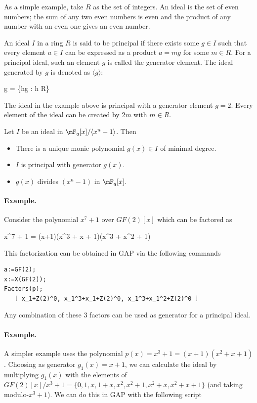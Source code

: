 As a simple example, take $R$ as the set of integers. An ideal is the set of even numbers; the sum of any two even numbers is even and the product of any number with an even one gives an even number.

\begin{definition}
  An ideal $I$ in a ring $R$ is said to be principal if there exists some $g \in I$ such that every element $a \in I$ can be expressed as a product $a = mg$ for some $m \in R$. For a principal ideal, such an element $g$ is called the generator element. The ideal generated by $g$ is denoted as $\langle g \rangle$:

  \bee
    \langle g \rangle = \{hg : h \in R\}
  \eee
  
\end{definition}

The ideal in the example above is principal with a generator element $g = 2$. Every element of the ideal can be created by $2m$ with $m \in R$.

\begin{theorem}
  Let $I$ be an ideal in $\mF_q[x] / \langle x^n-1 \rangle$. Then
  \begin{itemize}
    \item There is a unique monic polynomial $g(x) \in I$ of minimal degree.
    \item $I$ is principal with generator $g(x)$.
    \item $g(x)$ divides $(x^n-1)$ in $\mF_q[x]$.
  \end{itemize}

\end{theorem}

\paragraph{Example.}Consider the polynomial $x^7+1$ over $GF(2)[x]$ which can be factored as

\bee
x^7 + 1 = (x+1)(x^3 + x + 1)(x^3 + x^2 + 1)
\eee

This factorization can be obtained in GAP via the following commands

\begin{verbatim}
a:=GF(2);
x:=X(GF(2));
Factors(p);
   [ x_1+Z(2)^0, x_1^3+x_1+Z(2)^0, x_1^3+x_1^2+Z(2)^0 ]
\end{verbatim}

Any combination of these 3 factors can be used as generator for a principal ideal.

\paragraph{Example.} A simpler example uses the polynomial $p(x) = x^3+1 = (x+1)(x^2+x+1)$. Choosing as generator $g_1(x) = x+1$, we can calculate the ideal by multiplying $g_1(x)$ with the elements of $GF(2)[x]/x^3+1 = \{0,1,x,1+x, x^2, x^2+1, x^2+x, x^2+x+1\}$ (and taking modulo-$x^3+1$). We can do this in GAP with the following script

